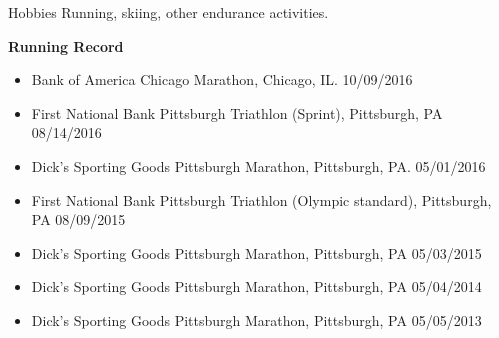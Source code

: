 \documentclass{resume} %
\begin{document}
\begin{rSection}{Hobbies}
Running, skiing, other endurance activities.

\textbf{Running Record}
\begin{itemize}[noitemsep,topsep=0pt]
    \item Bank of America Chicago Marathon, Chicago, IL. \hfill {10/09/2016}
    \item First National Bank Pittsburgh Triathlon (Sprint), Pittsburgh, PA \hfill {08/14/2016}
    \item Dick's Sporting Goods Pittsburgh Marathon, Pittsburgh, PA. \hfill {05/01/2016} 
    \item First National Bank Pittsburgh Triathlon (Olympic standard), Pittsburgh, PA \hfill {08/09/2015}
    \item {Dick's Sporting Goods Pittsburgh Marathon}, {Pittsburgh, PA} \hfill  {05/03/2015}
    \item {Dick's Sporting Goods Pittsburgh Marathon}, {Pittsburgh, PA} \hfill  {{05/04/2014}}
    \item {Dick's Sporting Goods Pittsburgh Marathon}, {Pittsburgh, PA} \hfill  {05/05/2013}
\end{itemize}

\end{rSection}






\end{document}
